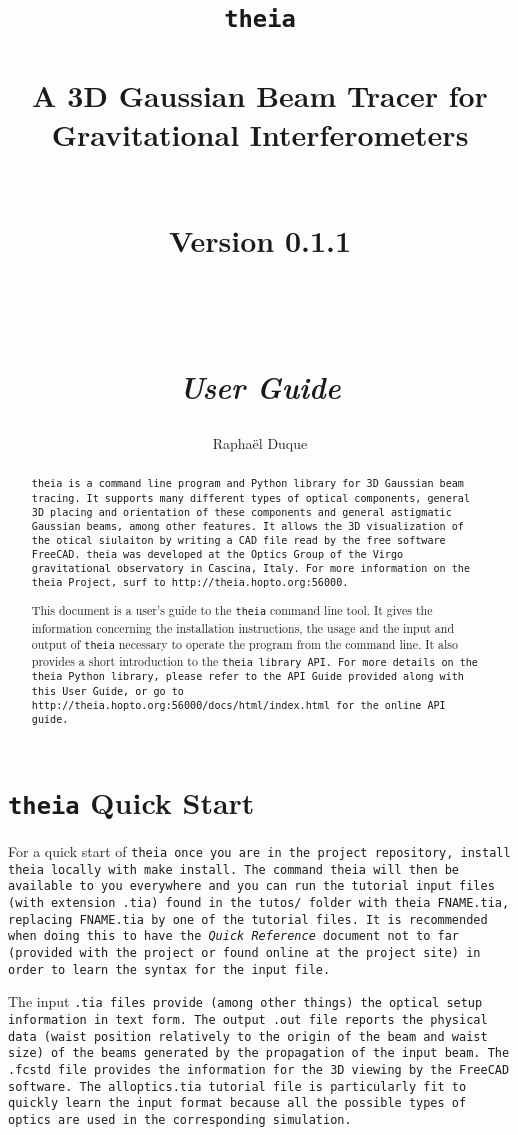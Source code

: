 \documentclass{article}
\title{\texttt{theia} \\ \quad \\A 3D Gaussian Beam Tracer for Gravitational Interferometers\\ \quad \\ \begin{small} Version 0.1.1 \end{small} \\ \quad \\ \textit{User Guide}}
\author{Rapha\"el Duque}
\begin{document}
\maketitle

\begin{abstract}
\tt{theia} is a command line program and Python library for 3D Gaussian beam tracing. It supports many different types of optical components, general 3D placing and orientation of these components and general astigmatic Gaussian beams, among other features. It allows the 3D visualization of the otical siulaiton by writing a CAD file read by the free software \tt{FreeCAD}. \tt{theia} was developed at the Optics Group of the Virgo gravitational observatory in Cascina, Italy. For more information on the theia Project, surf to \tt{http://theia.hopto.org:56000}.

This document is a user's guide to the \texttt{theia} command line tool. It gives the information concerning the installation instructions, the usage and the input and output of \texttt{theia} necessary to operate the program from the command line. It also provides a short introduction to the \tt{theia} library API. For more details on the \texttt{theia} Python library, please refer to the API Guide provided along with this User Guide, or go to \tt{http://theia.hopto.org:56000/docs/html/index.html} for the online API guide.
\end{abstract}


\tableofcontents
\newpage


\section{\texttt{theia} Quick Start}
For a quick start of \tt{theia} once you are in the project repository, install \tt{theia} locally with \texttt{make install}. The command \tt{theia} will then be available to you everywhere and you can run the tutorial input files (with extension \texttt{.tia}) found in the \tt{tutos/} folder with \texttt{theia FNAME.tia}, replacing \texttt{FNAME.tia} by one of the tutorial files. It is recommended when doing this to have the \textit{Quick Reference} document not to far (provided with the project or found online at the project site) in order to learn the syntax for the input file.

The input \tt{.tia} files provide (among other things) the optical setup information in text form. The output \tt{.out} file reports the physical data (waist position relatively to the origin of the beam and waist size) of the beams generated by the propagation of the input beam. The \tt{.fcstd} file provides the information for the 3D viewing by the \tt{FreeCAD} software. The \tt{alloptics.tia} tutorial file is particularly fit to quickly learn the input format because all the possible types of optics are used in the corresponding simulation.
\end{document}
